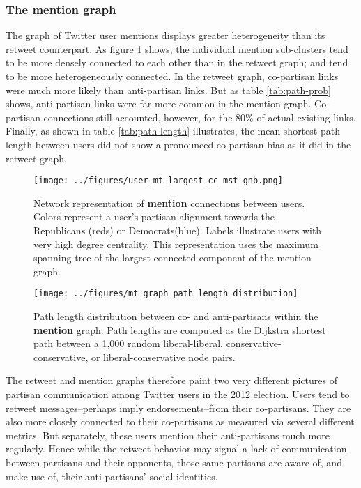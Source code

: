 \documentclass[11pt]{article}
\begin{document}
\subsubsection{The mention graph}
\label{sec:mention-graph}

The graph of Twitter user mentions displays greater heterogeneity than
its retweet counterpart. As figure \ref{fig:mt-largest-cc-mst} shows,
the individual mention sub-clusters tend to be more densely connected
to each other than in the retweet graph; and tend to be more
heterogeneously connected. In the retweet graph, co-partisan
links were much more likely than anti-partisan links. But as table
\ref{tab:path-prob} shows, anti-partisan links were far more common in
the mention graph. Co-partisan connections still
accounted, however, for the 80\% of actual existing links. Finally, as
shown in table \ref{tab:path-length} illustrates, the mean shortest
path length between users did not show a pronounced co-partisan bias
as it did in the retweet graph.


\begin{figure}[ht]
  \centering
  \texttt{[image: ../figures/user\_mt\_largest\_cc\_mst\_gnb.png]}
  \caption{Network representation of \textbf{mention} connections between
    users. Colors represent a user's partisan alignment towards the
    Republicans (reds) or Democrats(blue). Labels illustrate users with
    very high degree centrality. This representation uses the maximum
    spanning tree of the largest connected component of the mention graph.}
  \label{fig:mt-largest-cc-mst}
\end{figure}


\begin{figure}[ht]
  \centering
  \texttt{[image: ../figures/mt\_graph\_path\_length\_distribution]}
  \caption{Path length distribution between co- and anti-partisans within the \textbf{mention} graph. Path lengths are computed as the Dijkstra shortest path between a 1,000 random liberal-liberal, conservative-conservative, or liberal-conservative node pairs. }
  \label{fig:rt-partisan-path-length}
\end{figure}

The retweet and mention graphs therefore paint two very different
pictures of partisan communication among Twitter users in the 2012
election. Users tend to retweet messages--perhaps imply
endorsements--from their co-partisans. They are also more closely
connected to their co-partisans as measured via several different
metrics. But separately, these users mention their anti-partisans
much more regularly. Hence while the retweet behavior may signal a
lack of communication between partisans and their opponents, those
same partisans are aware of, and make use of, their anti-partisans'
social identities. 
\end{document}
